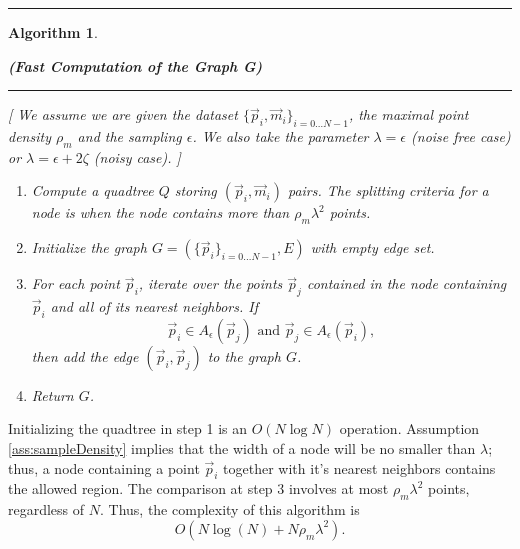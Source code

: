 \documentclass{article}
\newtheorem{algo}{Algorithm}
\numberwithin{cntr}{section}
\numberwithin{equation}{section}
\newcommand{\vp}[0]{{\vec{p}}}
\newcommand{\vm}[0]{{\vec{m}}}
\newcommand{\OtoN}{{0 \ldots N-1}}
\newcommand{\pointData}{{ \{ \vp_{i} \}_{i=\OtoN} }}
\newcommand{\allData}{{ \{ \vp_{i}, \vm_{i} \}_{i=\OtoN} }}
\newcommand{\allowed}[2]{ { A_{#1}(#2) } }
\newcommand{\pointNoise}{{\zeta}}
\newcommand{\densitymax}{{\rho_{m}}}
\begin{document}
\hrule
\begin{algo}
  \begin{center} {\bf (Fast Computation of the Graph G)}
  \end{center}

\vspace{.1in}

\hrule

\vspace{.2in}

[ We assume we are given the dataset $\allData$, the maximal point density $\densitymax$ and the sampling $\epsilon$. We also take the parameter $\lambda=\epsilon$ (noise free case) or $\lambda=\epsilon+2\pointNoise$ (noisy case). ]

\vspace{.1in}

  \begin{enumerate}
  \item Compute a quadtree $Q$ storing $(\vp_{i},\vm_{i})$ pairs. The splitting criteria for a node is when the node contains more than $\densitymax \lambda^{2}$ points.
  \item Initialize the graph $G = (\pointData, E)$ with empty edge set.
  \item For each point $\vp_{i}$, iterate over the points $\vp_{j}$ contained in the node containing $\vp_{i}$ and all of its nearest neighbors. If
    \begin{equation*}
      \vp_{i} \in \allowed{\epsilon}{\vp_{j}} \textrm{~and~} \vp_{j} \in \allowed{\epsilon}{\vp_{i}},
    \end{equation*}
    then add the edge $(\vp_{i},\vp_{j})$ to the graph $G$.
  \item Return $G$.
  \end{enumerate}
\end{algo}
Initializing the quadtree in step 1 is an $O(N \log N)$ operation. Assumption \ref{ass:sampleDensity} implies that the width of a node will be no smaller than $\lambda$; thus, a node containing a point $\vp_{i}$ together with it's nearest neighbors contains the allowed region. The comparison at step 3 involves at most $\densitymax \lambda^{2}$ points, regardless of $N$. Thus, the complexity of this algorithm is
\begin{equation}
  O(N \log(N) + N \densitymax \lambda^{2}).
\end{equation}
\end{document}
